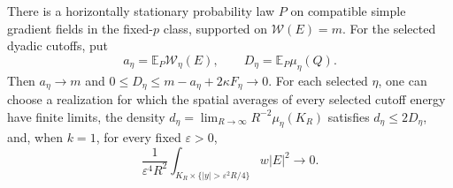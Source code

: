 \begin{lemma}
\label{lem:stationary-field-minimizers}
There is a horizontally stationary probability law $P$ on compatible
simple gradient fields in the fixed-$p$ class, supported on
$\mathcal W(E)=m$. For the selected dyadic cutoffs, put
\[
 a_\eta=\mathbb E_P\mathcal W_\eta(E),\qquad
 D_\eta=\mathbb E_P\mu_\eta(Q).
\]
Then $a_\eta\to m$ and $0\le D_\eta\le m-a_\eta+2\kappa F_\eta\to0$.
For each selected $\eta$, one can choose a realization for which the
spatial averages of every selected cutoff energy have finite limits, the density
$d_\eta=\lim_{R\to\infty}R^{-2}\mu_\eta(K_R)$ satisfies
$d_\eta\le2D_\eta$, and, when $k=1$, for every fixed $\varepsilon>0$,
\[
 \frac1{\varepsilon^4R^2}
 \int_{K_R\times\{|y|>\varepsilon^2R/4\}}w|E|^2\longrightarrow0.
\]
\end{lemma}


